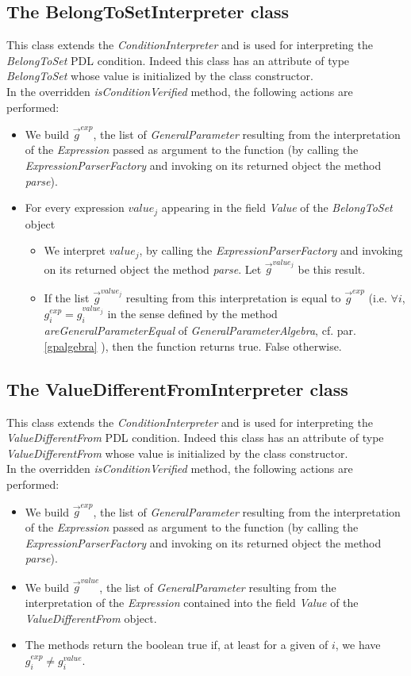 \documentclass[a4paper,11pt] {ivoa}
\begin{document}
\subsection{The BelongToSetInterpreter class}
This class extends the  {\it ConditionInterpreter} and is used for interpreting the {\it BelongToSet} PDL condition. Indeed this class has an attribute of type {\it BelongToSet} whose value is initialized by the class constructor. \\
In the overridden {\it isConditionVerified} method, the following actions are performed:
\begin{itemize}
\item We build $\vec g^{exp}$, the list of {\it GeneralParameter} resulting from the interpretation of the {\it Expression} passed as argument to the function (by calling the {\it ExpressionParserFactory} and invoking on its returned object the method {\it parse}).
\item For every expression $value_j$ appearing in the field {\it Value} of the {\it BelongToSet} object
\begin{itemize}
\item  We interpret $value_j$, by calling the {\it ExpressionParserFactory} and invoking on its returned object the method {\it parse}. Let $\vec g^{value_j}$ be this result.
\item If the list $\vec g^{value_j}$ resulting from this interpretation is equal to $\vec g^{exp}$ (i.e. $\forall i$, $g_i^{exp}=g_i^{value_j}$ in the sense defined by the method {\it areGeneralParameterEqual} of {\it GeneralParameterAlgebra}, cf. par. \ref{gpalgebra} ), then the function returns true. False otherwise. 
\end{itemize}
\end{itemize}

\subsection{The ValueDifferentFromInterpreter class}
This class  extends the  {\it ConditionInterpreter} and is used for interpreting the {\it ValueDifferentFrom} PDL condition. Indeed this class has an attribute of type {\it ValueDifferentFrom} whose value is initialized by the class constructor. \\
In the overridden {\it isConditionVerified} method, the following actions are performed:
\begin{itemize}
\item We build $\vec g^{exp}$, the list of {\it GeneralParameter} resulting from the interpretation of the {\it Expression} passed as argument to the function (by calling the {\it ExpressionParserFactory} and invoking on its returned object the method {\it parse}). 
\item We build $\vec g^{value}$, the list of  {\it GeneralParameter} resulting from the interpretation of the {\it Expression} contained into the field {\it Value} of the  {\it ValueDifferentFrom} object.
\item The methods return the boolean true if, at least for a given of $i$, we have $g_i^{exp} \neq g_i^{value}$.
\end{itemize}
\end{document}
